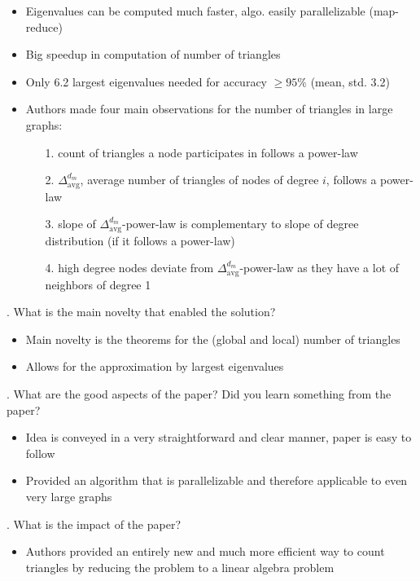 \documentclass[12pt]{article}
\begin{document}
\begin{itemize}
    \item Eigenvalues can be computed much faster, algo. easily parallelizable (map-reduce) 
    \item Big speedup in computation of number of triangles
    \item Only 6.2 largest eigenvalues needed for accuracy $\geq 95\%$ (mean, std. 3.2)
    \item Authors made four main observations for the number of triangles in large graphs:
    \begin{itemize}
        \item[1.] count of triangles a node participates in follows a power-law
        \item[2.] $\Delta_{\text{avg}}^{d_m}$, average number of triangles of nodes of degree $i$, follows a power-law
        \item[3.] slope of $\Delta_{\text{avg}}^{d_m}$-power-law is complementary to slope of degree distribution (if it follows a power-law)
        \item[4.] high degree nodes deviate from $\Delta_{\text{avg}}^{d_m}$-power-law as they have a lot of neighbors of degree 1
    \end{itemize}
\end{itemize}

. What is the main novelty that enabled the solution?

\begin{itemize}
    \item Main novelty is the theorems for the (global and local) number of triangles
    \item Allows for the approximation by largest eigenvalues
\end{itemize}

. What are the good aspects of the paper? Did you learn something from the paper?

\begin{itemize}
    \item Idea is conveyed in a very straightforward and clear manner, paper is easy to follow
    \item Provided an algorithm that is parallelizable and therefore applicable to even very large graphs
\end{itemize}

. What is the impact of the paper?

\begin{itemize}
    \item Authors provided an entirely new and much more efficient way to count triangles by reducing the problem to a linear algebra problem
\end{itemize}
\end{document}
